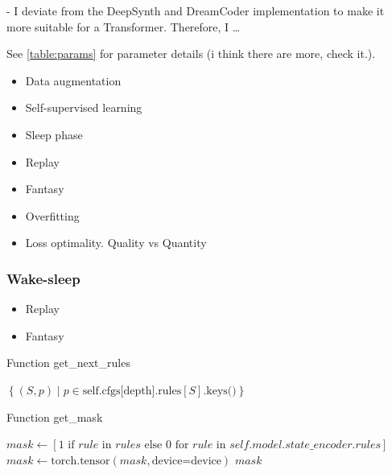 - I deviate from the DeepSynth and DreamCoder implementation to make it more suitable for a Transformer.
Therefore, I \dots


See \ref{table:params} for parameter details (i think there are more, check it.). 











\begin{itemize}
    \item Data augmentation
    \item Self-supervised learning
    \item Sleep phase
    \item Replay 
    \item Fantasy
    \item Overfitting
    \item Loss optimality. Quality vs Quantity
\end{itemize}

\subsubsection{Wake-sleep}
\begin{itemize}
    \item Replay
    \item Fantasy
\end{itemize}












\begin{algorithm}
\caption{Function get\_next\_rules}
\begin{algorithmic}[1]
    \State \Return $\left\{ (S, p) \mid p \in \text{self.cfgs[depth].rules}[S].\text{keys()} \right\}$
\EndFunction
\end{algorithmic}
\end{algorithm}

\begin{algorithm}
\caption{Function get\_mask}
\begin{algorithmic}[1]
    \State $mask \gets [1 \text{ if } rule \text{ in } rules \text{ else } 0 \text{ for } rule \text{ in } self.model.state\_encoder.rules]$
    \State $mask \gets \text{torch.tensor}(mask, \text{device=device})$
    \State \Return $mask$
\EndFunction
\end{algorithmic}
\end{algorithm}

